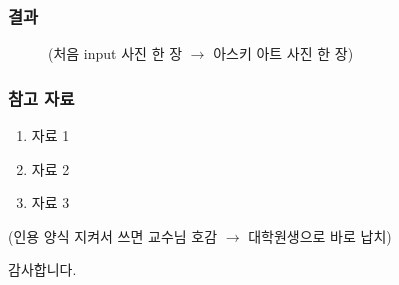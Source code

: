 \documentclass{beamer}
\begin{document}
	\begin{frame}{}
		\frametitle{결과}
		\begin{figure}
			\centering
			(처음 input 사진 한 장 $ \rightarrow $ 아스키 아트 사진 한 장)
		\end{figure}
	\end{frame}
	\begin{frame}{}
		\frametitle{참고 자료}
		\begin{enumerate}
			\item 자료 1
			\item 자료 2
			\item 자료 3
		\end{enumerate}
		(인용 양식 지켜서 쓰면 교수님 호감 $ \rightarrow $ 대학원생으로 바로 납치)
	\end{frame}

	\begin{frame}
		\centering
		감사합니다.
	\end{frame}
\end{document}
